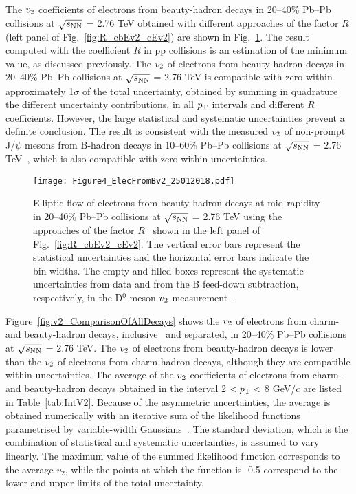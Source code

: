 \documentclass[11pt,a4paper]{article}
\providecommand{\pT}{$p_{\rm T}$ }
\providecommand{\vtwo}{$v_{\rm 2}$ }
\providecommand{\snn}{$\sqrt{s_{\rm NN}}$ }
\begin{document}
The \vtwo coefficients of electrons from beauty-hadron decays in 20--40\%  Pb--Pb collisions at \snn = 2.76 TeV obtained with different approaches of the factor $R$ (left panel of Fig.~\ref{fig:R_cbEv2_cEv2}) are shown in Fig.~\ref{fig:ElecFromBeautyv2_comparisonR_20161014.pdf}.
The result computed with  the coefficient $R$ in pp collisions is an estimation of the minimum value, as discussed previously. The \vtwo of electrons from beauty-hadron decays in 20--40\% Pb--Pb collisions at \snn = 2.76 TeV is compatible with zero within approximately 1$\sigma$  of the total uncertainty, obtained by summing in quadrature the different uncertainty contributions, in all \pT intervals and different  $R$ coefficients. However, the large statistical and systematic uncertainties prevent  a definite conclusion. 
The result is consistent with the measured \vtwo of non-prompt J/$\psi$ mesons from $\mathrm{B}$-hadron decays in 10--60\% Pb--Pb collisions at \snn = 2.76 TeV~\cite{Khachatryan:2016ypw}, which is also compatible with zero within uncertainties.

\begin{figure*}
\centering
  \texttt{[image: Figure4\_ElecFromBv2\_25012018.pdf]}
  \caption{Elliptic flow of electrons from beauty-hadron decays at mid-rapidity in 20--40\%  Pb--Pb collisions at \snn = 2.76 TeV using the  approaches of the factor $R$~\cite{Abelev:2014hla,2016507,Uphoff:2014hza} shown in the left panel of Fig.~\ref{fig:R_cbEv2_cEv2}. The vertical error bars represent the statistical uncertainties and the horizontal error bars indicate the bin widths.  The empty and filled boxes represent the systematic uncertainties from data and from the B feed-down subtraction, respectively, in the D$^0$-meson \vtwo measurement~\cite{Abelev:2014ipa}.}
   \label{fig:ElecFromBeautyv2_comparisonR_20161014.pdf}
\end{figure*}


Figure~\ref{fig:v2_ComparisonOfAllDecays} shows the \vtwo of electrons from charm- and beauty-hadron decays, inclusive~\cite{Adam:2016ssk} and separated, in 20--40\%  Pb--Pb collisions at \snn = 2.76 TeV.
The \vtwo of electrons from beauty-hadron decays is lower than the \vtwo of electrons from charm-hadron decays, although they are compatible within uncertainties. 
The average of the \vtwo coefficients of electrons from  charm- and beauty-hadron decays obtained in the interval 2 $<  p_{\rm T} <$ 8 GeV/$c$ are listed in Table~\ref{tab:IntV2}. Because of the asymmetric uncertainties, the average is obtained numerically with an iterative sum of the likelihood functions parametrised by variable-width Gaussians~\cite{Barlow:2004wg,Barlow:2003sg}.
The standard deviation, which is the combination of  statistical and systematic uncertainties, is assumed to vary linearly. 
The maximum value of the  summed likelihood function corresponds to the average $v_{2}$, while the points at which the function is -0.5 correspond to the  lower and upper limits of the total uncertainty.
\end{document}
